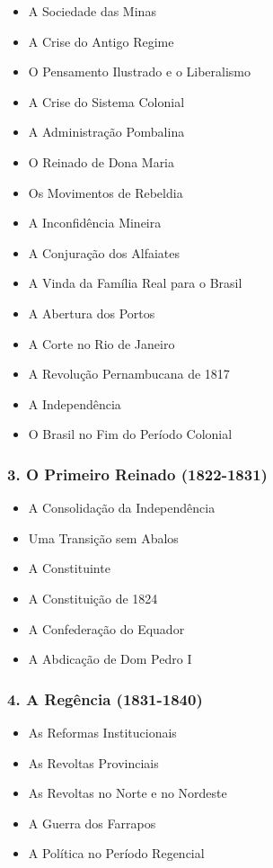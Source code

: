 \documentclass[a4paper,12pt]{article}[abntex2]
\begin{document}
\begin{itemize}
\item A Sociedade das Minas
\item A Crise do Antigo Regime
\item O Pensamento Ilustrado e o Liberalismo
\item A Crise do Sistema Colonial
\item A Administração Pombalina
\item O Reinado de Dona Maria
\item Os Movimentos de Rebeldia
\item A Inconfidência Mineira
\item A Conjuração dos Alfaiates
\item A Vinda da Família Real para o Brasil
\item A Abertura dos Portos
\item A Corte no Rio de Janeiro
\item A Revolução Pernambucana de 1817
\item A Independência
\item O Brasil no Fim do Período Colonial
\end{itemize}
\subsubsection*{3. O Primeiro Reinado (1822-1831)}

\begin{itemize}
\item A Consolidação da Independência
\item Uma Transição sem Abalos
\item A Constituinte
\item A Constituição de 1824
\item A Confederação do Equador
\item A Abdicação de Dom Pedro I
\end{itemize}
\subsubsection*{4. A Regência (1831-1840)}

\begin{itemize}
\item As Reformas Institucionais
\item As Revoltas Provinciais
\item As Revoltas no Norte e no Nordeste
\item A Guerra dos Farrapos
\item A Política no Período Regencial
\end{itemize}
\end{document}
